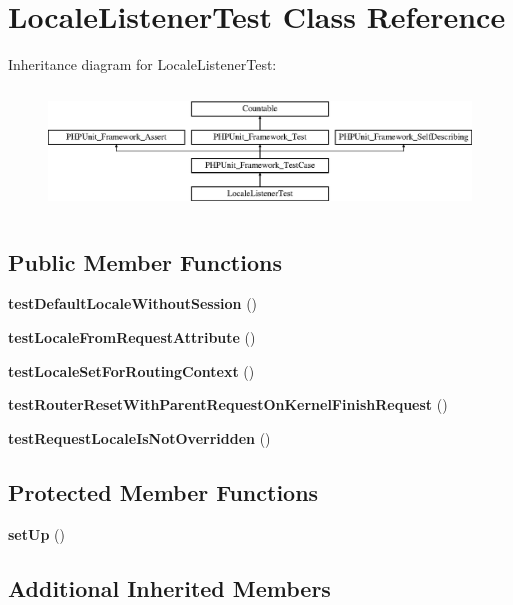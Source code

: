 \section{Locale\+Listener\+Test Class Reference}
\label{class_symfony_1_1_component_1_1_http_kernel_1_1_tests_1_1_event_listener_1_1_locale_listener_test}
Inheritance diagram for Locale\+Listener\+Test\+:\begin{figure}[H]
\begin{center}
\leavevmode
\includegraphics[height=3.303835cm]{class_symfony_1_1_component_1_1_http_kernel_1_1_tests_1_1_event_listener_1_1_locale_listener_test}
\end{center}
\end{figure}
\subsection*{Public Member Functions}
\begin{DoxyCompactItemize}
\item 
{\bf test\+Default\+Locale\+Without\+Session} ()
\item 
{\bf test\+Locale\+From\+Request\+Attribute} ()
\item 
{\bf test\+Locale\+Set\+For\+Routing\+Context} ()
\item 
{\bf test\+Router\+Reset\+With\+Parent\+Request\+On\+Kernel\+Finish\+Request} ()
\item 
{\bf test\+Request\+Locale\+Is\+Not\+Overridden} ()
\end{DoxyCompactItemize}
\subsection*{Protected Member Functions}
\begin{DoxyCompactItemize}
\item 
{\bf set\+Up} ()
\end{DoxyCompactItemize}
\subsection*{Additional Inherited Members}



